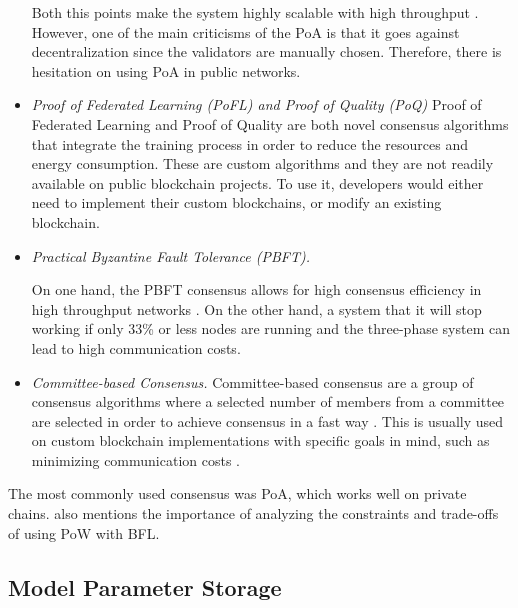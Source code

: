 \begin{itemize}
    Both this points make the system highly scalable with high throughput \cite{binance_academy_2020}. However, one of the main criticisms of the PoA is that it goes against decentralization since the validators are manually chosen. Therefore, there is hesitation on using PoA in public networks.

    \item \textit{Proof of Federated Learning (PoFL) and Proof of Quality (PoQ)} Proof of Federated Learning \cite{9347812, 10.48550/arxiv.2007.15145} and Proof of Quality \cite{8843900} are both novel consensus algorithms that integrate the training process in order to reduce the resources and energy consumption. These are custom algorithms and they are not readily available on public blockchain projects. To use it, developers would either need to implement their custom blockchains, or modify an existing blockchain.

    \item \textit{Practical Byzantine Fault Tolerance (PBFT).}
    
    
    On one hand, the PBFT consensus allows for high consensus efficiency in high throughput networks \cite{li_blockchain_2021}. On the other hand, a system that it will stop working if only 33\% or less nodes are running and the three-phase system can lead to high communication costs.

    \item \textit{Committee-based Consensus.} Committee-based consensus are a group of consensus algorithms where a selected number of members from a committee are selected in order to achieve consensus in a fast way \cite{qu_blockchain-enabled_2022}. This is usually used on custom blockchain implementations with specific goals in mind, such as minimizing communication costs \cite{9293091}.
\end{itemize}

 The most commonly used consensus was PoA, which works well on private chains. \cite{10.48550/arxiv.2112.07938} also mentions the importance of analyzing the constraints and trade-offs of using PoW with BFL.  

\subsection{Model Parameter Storage}

